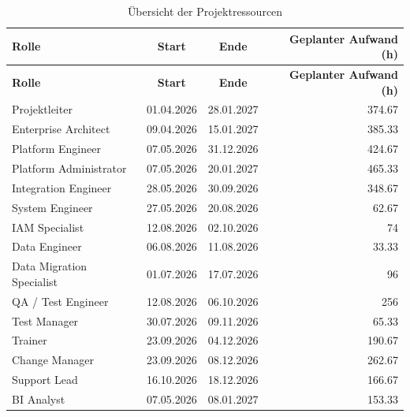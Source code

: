 \begin{xltabular}{\textwidth}{@{}Xccr@{}}
    \caption{Übersicht der Projektressourcen} \label{tab:resources} \\
    \hline
    \textbf{Rolle} & \textbf{Start} & \textbf{Ende} & \textbf{Geplanter Aufwand (h)} \\
    \hline
    \endfirsthead

    \hline
    \textbf{Rolle} & \textbf{Start} & \textbf{Ende} & \textbf{Geplanter Aufwand (h)} \\
    \hline
    \endhead

    Projektleiter & 01.04.2026 & 28.01.2027 & 374.67 \\

    Enterprise Architect & 09.04.2026 & 15.01.2027 & 385.33 \\

    Platform Engineer & 07.05.2026 & 31.12.2026 & 424.67 \\

    Platform Administrator & 07.05.2026 & 20.01.2027 & 465.33 \\

    Integration Engineer & 28.05.2026 & 30.09.2026 & 348.67 \\

    System Engineer & 27.05.2026 & 20.08.2026 & 62.67 \\

    IAM Specialist & 12.08.2026 & 02.10.2026 & 74 \\

    Data Engineer & 06.08.2026 & 11.08.2026 & 33.33 \\

    Data Migration Specialist & 01.07.2026 & 17.07.2026 & 96 \\

    QA / Test Engineer & 12.08.2026 & 06.10.2026 & 256 \\

    Test Manager & 30.07.2026 & 09.11.2026 & 65.33 \\

    Trainer & 23.09.2026 & 04.12.2026 & 190.67 \\

    Change Manager & 23.09.2026 & 08.12.2026 & 262.67 \\

    Support Lead & 16.10.2026 & 18.12.2026 & 166.67 \\

    BI Analyst & 07.05.2026 & 08.01.2027 & 153.33 \\


\end{xltabular}
